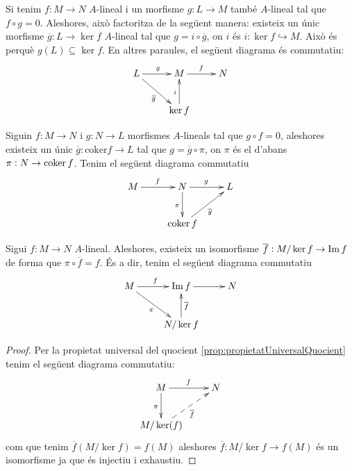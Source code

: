 \documentclass[../../../main.tex]{subfiles}
\begin{document}
\begin{prop}\label{prop:propietatUniversalNucli} Si tenim $f:M\to N$ $A$-lineal i un morfisme $g:L\to M$ també $A$-lineal tal que $f\circ g = 0$. Aleshores, això factoritza de la següent manera: existeix un únic morfisme $\overline{g}:L\to \ker f$ $A$-lineal tal que $g = i\circ \overline{g}$, on $i$ és $i:\ker f\hookrightarrow M$. Això és perquè $g(L)\subseteq\ker f$. En altres paraules, el següent diagrama és commutatiu:
\begin{equation}
    \notag
    \xymatrix{
    L\ar[r]^g\ar[dr]_{\overline{g}} & M\ar[r]^f & N\\
    & \ker f \ar[u]^{i} & 
    }
\end{equation}
\end{prop}


\begin{prop}\label{prop:propietatUniversalConucli} Siguin $f:M\to N$ i $g:N\to L$ morfismes $A$-lineals tal que $g\circ f = 0$, aleshores existeix un únic $\overline{g}:\mathrm{coker}f\to L$ tal que $g = \overline{g}\circ\pi$, on $\pi$ és el d'abans $\pi:N\rightarrow\operatorname{coker} f$. Tenim el següent diagrama commutatiu
\begin{equation}
    \notag
    \xymatrix{
    M\ar[r]^f & N\ar[d]_\pi \ar[r]^g & L \\
     & \coker f \ar[ur]_{\overline{g}}
    }
\end{equation}
\end{prop}


\begin{ter}
\label{ter:primerteoremadisomorfia} Sigui $f:M\to N$ $A$-lineal. Aleshores, existeix un isomorfisme $\overline{f}:M/\ker f\to\operatorname{Im} f$ de forma que $\pi\circ\overline{f} = f$. És a dir, tenim el següent diagrama commutatiu
\begin{equation}
    \notag
    \xymatrix{
    M\ar[r]^f\ar[dr]_\pi & \im f\ar[r] & N\\
    & N/\ker f\ar[u]_{\overline{f}}
    }
\end{equation}
\end{ter}
\begin{proof}
Per la propietat universal del quocient \ref{prop:propietatUniversalQuocient} tenim el següent diagrama commutatiu:
\begin{equation}
    \notag
    \xymatrix{
    M\ar[r]^f \ar[d]_\pi & N\\
    M/\ker(f)\ar@{-->}[ur]_{\overline{f}}
    }
\end{equation}
com que tenim $\overline{f}(M/\ker f) = f(M)$ aleshores $\overline{f}:M/\ker f\to f(M)$ és un isomorfisme ja que és injectiu i exhaustiu.
\end{proof}
\end{document}
